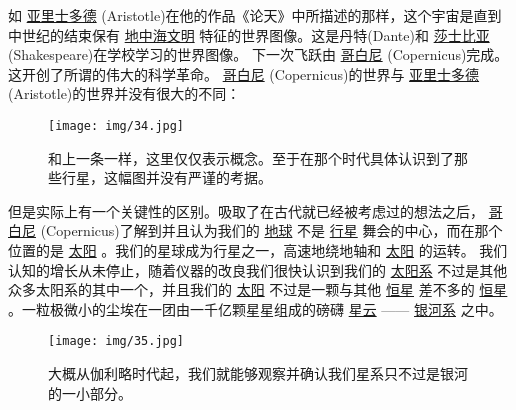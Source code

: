     如
\href{http://toyhouse.cc/wiki/index.php/亚里士多德}{亚里士多德}
(Aristotle)在他的作品《论天》中所描述的那样，这个宇宙是直到中世纪的结束保有
\href{http://toyhouse.cc/wiki/index.php/地中海文明}{地中海文明}
特征的世界图像。这是丹特(Dante)和
\href{http://toyhouse.cc/wiki/index.php/莎士比亚}{莎士比亚}
(Shakespeare)在学校学习的世界图像。
    下一次飞跃由
\href{http://toyhouse.cc/wiki/index.php/哥白尼}{哥白尼}
(Copernicus)完成。这开创了所谓的伟大的科学革命。
\href{http://toyhouse.cc/wiki/index.php/哥白尼}{哥白尼}
(Copernicus)的世界与
\href{http://toyhouse.cc/wiki/index.php/亚里士多德}{亚里士多德}
(Aristotle)的世界并没有很大的不同：
\begin{figure}[htbp]
\begin{minipage}[t]{0.3\linewidth}
\centering
\bc
\texttt{[image: img/34.jpg]}\\[12pt]
\ec
\caption{和上一条一样，这里仅仅表示概念。至于在那个时代具体认识到了那些行星，这幅图并没有严谨的考据。}
\label{fig:side:a}
\end{minipage}

\end{figure}        

    但是实际上有一个关键性的区别。吸取了在古代就已经被考虑过的想法之后，
\href{http://toyhouse.cc/wiki/index.php/哥白尼}{哥白尼}
(Copernicus)了解到并且认为我们的
\href{http://toyhouse.cc/wiki/index.php/地球}{地球}
不是
\href{http://toyhouse.cc/wiki/index.php/行星}{行星}
舞会的中心，而在那个位置的是
\href{http://toyhouse.cc/wiki/index.php/太阳}{太阳}
。我们的星球成为行星之一，高速地绕地轴和
\href{http://toyhouse.cc/wiki/index.php/太阳}{太阳}
的运转。
    我们认知的增长从未停止，随着仪器的改良我们很快认识到我们的
\href{http://toyhouse.cc/wiki/index.php/太阳系}{太阳系}
不过是其他众多太阳系的其中一个，并且我们的
\href{http://toyhouse.cc/wiki/index.php/太阳}{太阳}
不过是一颗与其他
\href{http://toyhouse.cc/wiki/index.php/恒星}{恒星}
差不多的
\href{http://toyhouse.cc/wiki/index.php/恒星}{恒星}
。一粒极微小的尘埃在一团由一千亿颗星星组成的磅礴
\href{http://toyhouse.cc/wiki/index.php/星云}{星云}
——
\href{http://toyhouse.cc/wiki/index.php/银河系}{银河系}
之中。

\begin{figure}[htbp]
\begin{minipage}[t]{0.3\linewidth}
\centering
\bc
\texttt{[image: img/35.jpg]}\\[12pt]
\ec
\caption{大概从伽利略时代起，我们就能够观察并确认我们星系只不过是银河的一小部分。}
\label{fig:side:a}
\end{minipage}

\end{figure}       


